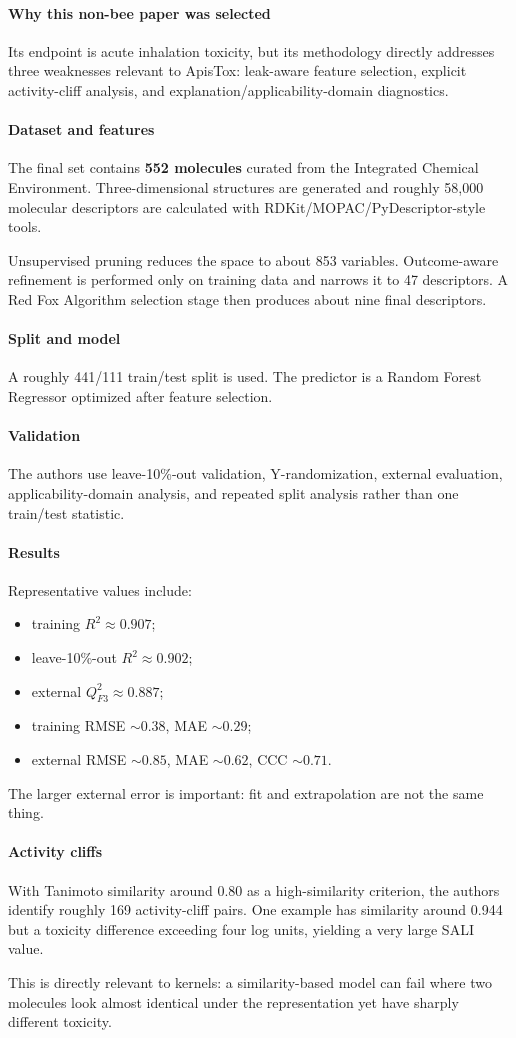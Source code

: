 \documentclass[11pt]{article}
\newcommand{\reviewfield}[2]{\paragraph{#1}#2}
\begin{document}
\reviewfield{Why this non-bee paper was selected}{
Its endpoint is acute inhalation toxicity, but its methodology directly addresses three weaknesses relevant to ApisTox: leak-aware feature selection, explicit activity-cliff analysis, and explanation/applicability-domain diagnostics.
}

\reviewfield{Dataset and features}{
The final set contains \textbf{552 molecules} curated from the Integrated Chemical Environment. Three-dimensional structures are generated and roughly 58,000 molecular descriptors are calculated with RDKit/MOPAC/PyDescriptor-style tools.

Unsupervised pruning reduces the space to about 853 variables. Outcome-aware refinement is performed only on training data and narrows it to 47 descriptors. A Red Fox Algorithm selection stage then produces about nine final descriptors.
}

\reviewfield{Split and model}{
A roughly 441/111 train/test split is used. The predictor is a Random Forest Regressor optimized after feature selection.
}

\reviewfield{Validation}{
The authors use leave-10\%-out validation, Y-randomization, external evaluation, applicability-domain analysis, and repeated split analysis rather than one train/test statistic.
}

\reviewfield{Results}{
Representative values include:
\begin{itemize}
    \item training $R^2\approx0.907$;
    \item leave-10\%-out $R^2\approx0.902$;
    \item external $Q^2_{F3}\approx0.887$;
    \item training RMSE $\sim0.38$, MAE $\sim0.29$;
    \item external RMSE $\sim0.85$, MAE $\sim0.62$, CCC $\sim0.71$.
\end{itemize}
The larger external error is important: fit and extrapolation are not the same thing.
}

\reviewfield{Activity cliffs}{
With Tanimoto similarity around 0.80 as a high-similarity criterion, the authors identify roughly 169 activity-cliff pairs. One example has similarity around 0.944 but a toxicity difference exceeding four log units, yielding a very large SALI value.

This is directly relevant to kernels: a similarity-based model can fail where two molecules look almost identical under the representation yet have sharply different toxicity.
}
\end{document}
